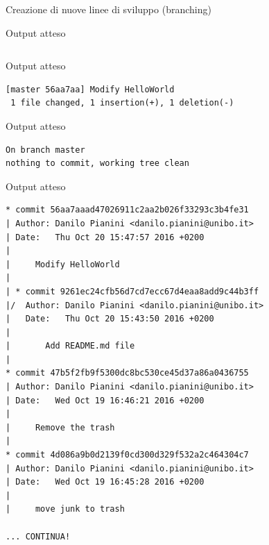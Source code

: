 \documentclass[xcolor=dvipsnames,presentation]{beamer}
\begin{document}
\begin{frame}{Creazione di nuove linee di sviluppo (branching)}
\begin{block}{Output atteso}
\begin{Verbatim}[fontsize=\scriptsize]
        \end{Verbatim}
    \end{block}
    \begin{block}{Output atteso}
        \begin{Verbatim}[fontsize=\scriptsize]
[master 56aa7aa] Modify HelloWorld
 1 file changed, 1 insertion(+), 1 deletion(-)
        \end{Verbatim}
    \end{block}
    \begin{block}{Output atteso}
        \begin{Verbatim}[fontsize=\scriptsize]
On branch master
nothing to commit, working tree clean
        \end{Verbatim}
    \end{block}
    \begin{block}{Output atteso}
        \begin{Verbatim}[fontsize=\tiny]
* commit 56aa7aaad47026911c2aa2b026f33293c3b4fe31
| Author: Danilo Pianini <danilo.pianini@unibo.it>
| Date:   Thu Oct 20 15:47:57 2016 +0200
|
|     Modify HelloWorld
|
| * commit 9261ec24cfb56d7cd7ecc67d4eaa8add9c44b3ff
|/  Author: Danilo Pianini <danilo.pianini@unibo.it>
|   Date:   Thu Oct 20 15:43:50 2016 +0200
|
|       Add README.md file
|
* commit 47b5f2fb9f5300dc8bc530ce45d37a86a0436755
| Author: Danilo Pianini <danilo.pianini@unibo.it>
| Date:   Wed Oct 19 16:46:21 2016 +0200
|
|     Remove the trash
|
* commit 4d086a9b0d2139f0cd300d329f532a2c464304c7
| Author: Danilo Pianini <danilo.pianini@unibo.it>
| Date:   Wed Oct 19 16:45:28 2016 +0200
|
|     move junk to trash

... CONTINUA!
        \end{Verbatim}
    \end{block}
\end{frame}
\end{document}
